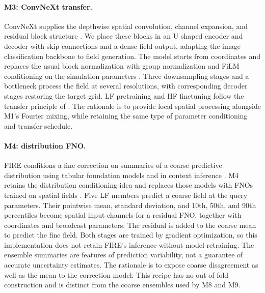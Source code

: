\paragraph{M3: ConvNeXt transfer.}
ConvNeXt supplies the depthwise spatial convolution, channel expansion, and
residual block structure \citep{liu2022convnext}. We place these blocks in an
U shaped encoder and decoder with skip connections \citep{ronneberger2015} and
a dense field output, adapting the image classification backbone to field
generation. The model starts from
coordinates and replaces the usual block normalization with group normalization
and FiLM conditioning on the simulation parameters \citep{perez2018}. Three
downsampling stages and a bottleneck process the field at several resolutions,
with corresponding decoder stages restoring the target grid. LF pretraining
and HF finetuning follow the transfer principle of \citet{lyu2023}. The
rationale is to provide local spatial processing alongside M1's Fourier mixing,
while retaining the same type of parameter conditioning and transfer schedule.

\paragraph{M4: distribution FNO.}
FIRE conditions a fine correction on summaries of a coarse predictive
distribution using tabular foundation models and in context inference
\citep{yu2026fire}. M4 retains the distribution conditioning idea and replaces
those models with FNOs trained on spatial fields \citep{li2021fno}. Five LF
members predict a coarse field at the query parameters. Their pointwise mean,
standard deviation, and 10th, 50th, and 90th percentiles become spatial input
channels for a residual FNO, together with coordinates and broadcast parameters.
The residual is added to the coarse mean to predict the fine field. Both stages
are trained by gradient optimization, so this implementation does not retain
FIRE's inference without model retraining. The ensemble summaries are features
of prediction variability, not a guarantee of accurate uncertainty estimates. The
rationale is to expose coarse disagreement as well as the mean to the
correction model. This recipe has no out of fold construction and is distinct
from the coarse ensembles used by M8 and M9.


